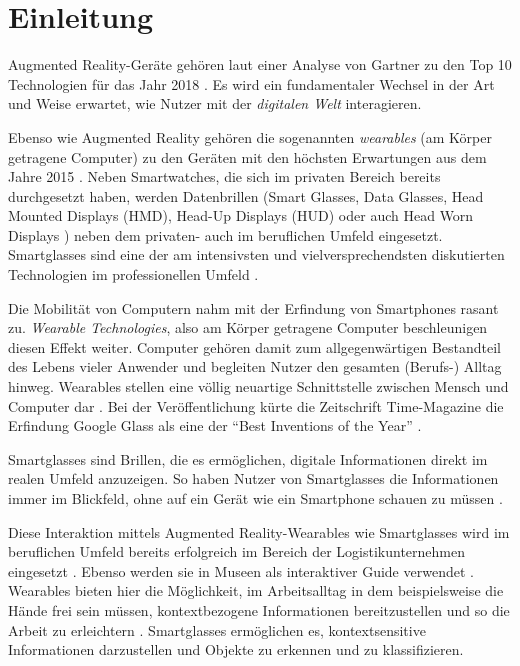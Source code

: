 %
%
%
%
%
%
\chapter{Einleitung}
\label{ch:Einleitung}
Augmented Reality-Geräte gehören laut einer Analyse von Gartner zu den Top 10 Technologien für das Jahr 2018 \cite{Panetta2017a}. Es wird ein fundamentaler Wechsel in der Art und Weise erwartet, wie Nutzer mit der \emph{digitalen Welt} interagieren. 

Ebenso wie Augmented Reality gehören die sogenannten \emph{wearables} (am Körper getragene Computer) zu den Geräten mit den höchsten Erwartungen aus dem Jahre 2015 \cite{Levy2015}. Neben Smartwatches, die sich im privaten Bereich bereits durchgesetzt haben, werden Datenbrillen (Smart Glasses, Data Glasses, Head Mounted Displays (HMD), Head-Up Displays (HUD) oder auch Head Worn Displays \cite{Zobel2016}) neben dem privaten- auch im beruflichen Umfeld eingesetzt. Smartglasses sind eine der am intensivsten und vielversprechendsten diskutierten Technologien im professionellen Umfeld \cite{Hein2016}.

Die Mobilität von Computern nahm mit der Erfindung von Smartphones rasant zu. \emph{Wearable Technologies}, also am Körper getragene Computer beschleunigen diesen Effekt weiter. Computer gehören damit zum allgegenwärtigen Bestandteil des Lebens vieler Anwender und begleiten Nutzer den gesamten (Berufs-) Alltag hinweg. Wearables stellen eine völlig neuartige Schnittstelle zwischen Mensch und Computer dar \cite[S.~25f]{Schwenke2016}. Bei der Veröffentlichung kürte die Zeitschrift Time-Magazine die Erfindung Google Glass als eine der \enquote{Best Inventions of the Year} \cite{Bilton2015}.

Smartglasses sind Brillen, die es ermöglichen, digitale Informationen direkt im realen Umfeld anzuzeigen. So haben Nutzer von Smartglasses die Informationen immer im Blickfeld, ohne auf ein Gerät wie ein Smartphone schauen zu müssen \cite{Due2014Glasses}.

Diese Interaktion mittels Augmented Reality-Wearables wie Smartglasses wird im beruflichen Umfeld bereits erfolgreich im Bereich der Logistikunternehmen eingesetzt \cite{Plutz}.
Ebenso werden sie in Museen als interaktiver Guide verwendet \cite{Hein2016}. 
Wearables bieten hier die Möglichkeit, im Arbeitsalltag in dem beispielsweise die Hände frei sein müssen, kontextbezogene Informationen bereitzustellen und so die Arbeit zu erleichtern \cite{Zobel2016}. Smartglasses ermöglichen es, kontextsensitive Informationen darzustellen und Objekte zu erkennen und zu klassifizieren.
%
%

